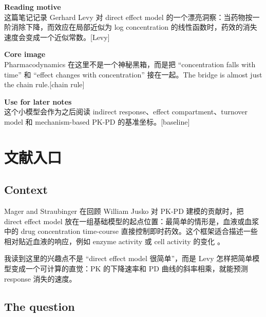 \documentclass[a4paper]{article}
\begin{document}
\maketitle
{\small
  \noindent\textbf{Reading motive}\\
  这篇笔记记录 Gerhard Levy 对 direct effect model 的一个漂亮洞察：当药物按一阶消除下降，而效应在局部近似为 log concentration 的线性函数时，药效的消失速度会变成一个近似常数。\hspace*{\fill}[Levy]

  \vspace{5pt}
  \noindent\textbf{Core image}\\
  Pharmacodynamics 在这里不是一个神秘黑箱，而是把 ``concentration falls with time'' 和 ``effect changes with concentration'' 接在一起。The bridge is almost just the chain rule.\hspace*{\fill}[chain rule]

  \vspace{5pt}
  \noindent\textbf{Use for later notes}\\
  这个小模型会作为之后阅读 indirect response、effect compartment、turnover model 和 mechanism-based PK-PD 的基准坐标。\hspace*{\fill}[baseline]
}

\tableofcontents

\section{文献入口}

\subsection{Context}

Mager and Straubinger 在回顾 William Jusko 对 PK-PD 建模的贡献时，把 direct effect model 放在一组基础模型的起点位置：最简单的情形是，血液或血浆中的 drug concentration time-course 直接控制即时药效。这个框架适合描述一些相对贴近血液的响应，例如 enzyme activity 或 cell activity 的变化 \cite{mager2024jusko}。

\begin{remark}
  我读到这里的兴趣点不是 ``direct effect model 很简单''，而是 Levy 怎样把简单模型变成一个可计算的直觉：PK 的下降速率和 PD 曲线的斜率相乘，就能预测 response 消失的速度。
\end{remark}

\subsection{The question}
\end{document}
